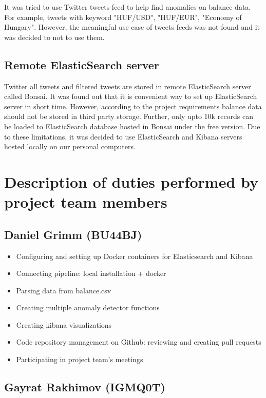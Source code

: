 \documentclass{article}
\begin{document}
It was tried to use Twitter tweets feed to help find anomalies on balance data. For example, tweets with keyword "HUF/USD", "HUF/EUR", "Economy of Hungary". However, the meaningful use case of tweets feeds was not found and it was decided to not to use them.

\subsection{Remote ElasticSearch server}

Twitter all tweets and filtered tweets are stored in remote ElasticSearch server called Bonsai. It was found out that it is convenient way to set up ElasticSearch server in short time. However, according to the project requirements balance data should not be stored in third party storage. Further, only upto 10k records can be loaded to ElasticSearch database hosted in Bonsai under the free version. Due to these limitations, it was decided to use ElasticSearch and Kibana servers hosted locally on our personal computers.
\section{Description of duties performed by project team members}

\subsection{Daniel Grimm (BU44BJ)}

\begin{itemize}
    \item Configuring and setting up Docker containers for Elasticsearch and Kibana
    \item Connecting pipeline: local installation + docker
    \item Parsing data from balance.csv
    \item Creating multiple anomaly detector functions
    \item Creating kibana visualizations
    \item Code  repository  management  on  Github: reviewing and creating pull requests
    \item Participating in project team’s meetings
\end{itemize}

\subsection{Gayrat Rakhimov (IGMQ0T)}
\end{document}
